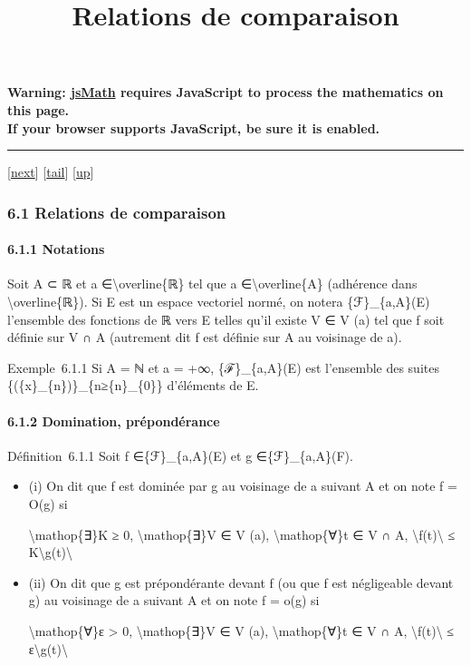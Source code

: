 \documentclass[]{article}
\title{Relations de comparaison}
\author{}
\date{}
\begin{document}
\maketitle

\textbf{Warning: \href{http://www.math.union.edu/locate/jsMath}{jsMath}
requires JavaScript to process the mathematics on this page.\\ If your
browser supports JavaScript, be sure it is enabled.}

\begin{center}\rule{3in}{0.4pt}\end{center}

{[}\href{coursse33.html}{next}{]}
{[}\hyperref[tailcoursse32.html]{tail}{]}
{[}\href{coursch7.html\#coursse32.html}{up}{]}

\subsubsection{6.1 Relations de comparaison}

\paragraph{6.1.1 Notations}

Soit A ⊂ ℝ et a ∈\textbackslash{}overline\{ℝ\} tel que a
∈\textbackslash{}overline\{A\} (adhérence dans
\textbackslash{}overline\{ℝ\}). Si E est un espace vectoriel normé, on
notera \{ℱ\}\_\{a,A\}(E) l'ensemble des fonctions de ℝ vers E telles
qu'il existe V ∈ V (a) tel que f soit définie sur V ∩ A (autrement dit f
est définie sur A au voisinage de a).

Exemple~6.1.1 Si A = ℕ et a = +∞, \{ℱ\}\_\{a,A\}(E) est l'ensemble des
suites \{(\{x\}\_\{n\})\}\_\{n≥\{n\}\_\{0\}\} d'éléments de E.

\paragraph{6.1.2 Domination, prépondérance}

Définition~6.1.1 Soit f ∈\{ℱ\}\_\{a,A\}(E) et g ∈\{ℱ\}\_\{a,A\}(F).

\begin{itemize}
\item
  (i) On dit que f est dominée par g au voisinage de a suivant A et on
  note f = O(g) si

  \textbackslash{}mathop\{∃\}K ≥ 0, \textbackslash{}mathop\{∃\}V ∈ V
  (a), \textbackslash{}mathop\{∀\}t ∈ V ∩ A,
  \textbackslash{}\textbar{}f(t)\textbackslash{}\textbar{} ≤
  K\textbackslash{}\textbar{}g(t)\textbackslash{}\textbar{}
\item
  (ii) On dit que g est prépondérante devant f (ou que f est négligeable
  devant g) au voisinage de a suivant A et on note f = o(g) si

  \textbackslash{}mathop\{∀\}ε \textgreater{} 0,
  \textbackslash{}mathop\{∃\}V ∈ V (a), \textbackslash{}mathop\{∀\}t ∈ V
  ∩ A, \textbackslash{}\textbar{}f(t)\textbackslash{}\textbar{} ≤
  ε\textbackslash{}\textbar{}g(t)\textbackslash{}\textbar{}
\end{itemize}
\end{document}

